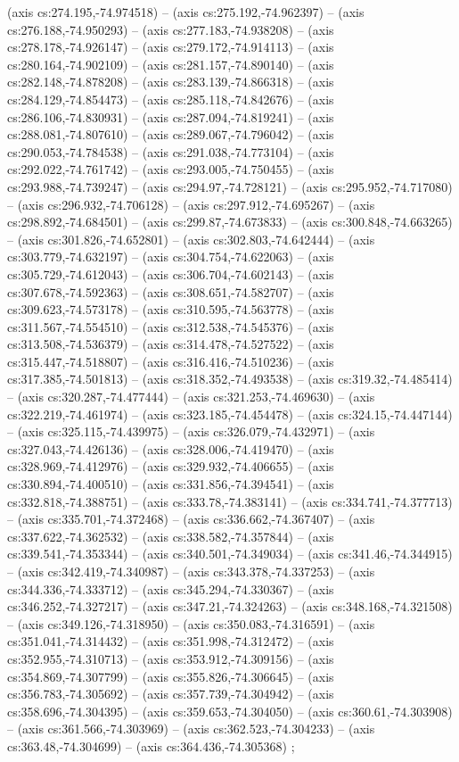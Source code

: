     (axis cs:274.195,-74.974518) --  (axis cs:275.192,-74.962397) --  (axis cs:276.188,-74.950293) --  (axis cs:277.183,-74.938208) --  (axis cs:278.178,-74.926147) --  (axis cs:279.172,-74.914113) --  (axis cs:280.164,-74.902109) --  (axis cs:281.157,-74.890140) --  (axis cs:282.148,-74.878208) --  (axis cs:283.139,-74.866318) --  (axis cs:284.129,-74.854473) --  (axis cs:285.118,-74.842676) --  (axis cs:286.106,-74.830931) --  (axis cs:287.094,-74.819241) --  (axis cs:288.081,-74.807610) --  (axis cs:289.067,-74.796042) --  (axis cs:290.053,-74.784538) --  (axis cs:291.038,-74.773104) --  (axis cs:292.022,-74.761742) --  (axis cs:293.005,-74.750455) --  (axis cs:293.988,-74.739247) --  (axis cs:294.97,-74.728121) --  (axis cs:295.952,-74.717080) --  (axis cs:296.932,-74.706128) --  (axis cs:297.912,-74.695267) --  (axis cs:298.892,-74.684501) --  (axis cs:299.87,-74.673833) --  (axis cs:300.848,-74.663265) --  (axis cs:301.826,-74.652801) --  (axis cs:302.803,-74.642444) --  (axis cs:303.779,-74.632197) --  (axis cs:304.754,-74.622063) --  (axis cs:305.729,-74.612043) --  (axis cs:306.704,-74.602143) --  (axis cs:307.678,-74.592363) --  (axis cs:308.651,-74.582707) --  (axis cs:309.623,-74.573178) --  (axis cs:310.595,-74.563778) --  (axis cs:311.567,-74.554510) --  (axis cs:312.538,-74.545376) --  (axis cs:313.508,-74.536379) --  (axis cs:314.478,-74.527522) --  (axis cs:315.447,-74.518807) --  (axis cs:316.416,-74.510236) --  (axis cs:317.385,-74.501813) --  (axis cs:318.352,-74.493538) --  (axis cs:319.32,-74.485414) --  (axis cs:320.287,-74.477444) --  (axis cs:321.253,-74.469630) --  (axis cs:322.219,-74.461974) --  (axis cs:323.185,-74.454478) --  (axis cs:324.15,-74.447144) --  (axis cs:325.115,-74.439975) --  (axis cs:326.079,-74.432971) --  (axis cs:327.043,-74.426136) --  (axis cs:328.006,-74.419470) --  (axis cs:328.969,-74.412976) --  (axis cs:329.932,-74.406655) --  (axis cs:330.894,-74.400510) --  (axis cs:331.856,-74.394541) --  (axis cs:332.818,-74.388751) --  (axis cs:333.78,-74.383141) --  (axis cs:334.741,-74.377713) --  (axis cs:335.701,-74.372468) --  (axis cs:336.662,-74.367407) --  (axis cs:337.622,-74.362532) --  (axis cs:338.582,-74.357844) --  (axis cs:339.541,-74.353344) --  (axis cs:340.501,-74.349034) --  (axis cs:341.46,-74.344915) --  (axis cs:342.419,-74.340987) --  (axis cs:343.378,-74.337253) --  (axis cs:344.336,-74.333712) --  (axis cs:345.294,-74.330367) --  (axis cs:346.252,-74.327217) --  (axis cs:347.21,-74.324263) --  (axis cs:348.168,-74.321508) --  (axis cs:349.126,-74.318950) --  (axis cs:350.083,-74.316591) --  (axis cs:351.041,-74.314432) --  (axis cs:351.998,-74.312472) --  (axis cs:352.955,-74.310713) --  (axis cs:353.912,-74.309156) --  (axis cs:354.869,-74.307799) --  (axis cs:355.826,-74.306645) --  (axis cs:356.783,-74.305692) --  (axis cs:357.739,-74.304942) --  (axis cs:358.696,-74.304395) --  (axis cs:359.653,-74.304050) --  (axis cs:360.61,-74.303908) --  (axis cs:361.566,-74.303969) --  (axis cs:362.523,-74.304233) --  (axis cs:363.48,-74.304699) --  (axis cs:364.436,-74.305368) ;
